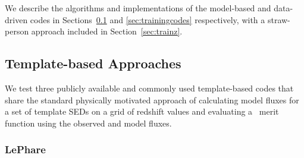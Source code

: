 We describe the algorithms and implementations of the model-based and data-driven codes in Sections~\ref{sec:templatecodes} and \ref{sec:trainingcodes} respectively, with a straw-person approach included in Section~\ref{sec:trainz}.
%
%

\subsection{Template-based Approaches}
\label{sec:templatecodes}

We test three publicly available and commonly used template-based codes that share the standard physically motivated approach of calculating model fluxes for a set of template SEDs on a grid of redshift values and evaluating a \chisq\ merit function using the observed and model fluxes.

\subsubsection{LePhare}
\label{sec:lephare}

